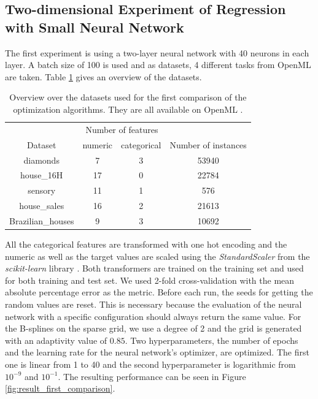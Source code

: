 \subsection{Two-dimensional Experiment of Regression with Small Neural Network}

The first experiment is using a two-layer neural network with 40 neurons in each layer. A batch size of 100 is used and as datasets, 4 different tasks from OpenML are taken. Table \ref{tab:datasets_first_experiment} gives an overview of the datasets. 

\begin{table}[H]
	\centering
	\caption{ Overview over the datasets used for the first comparison of the optimization algorithms. They are all available on OpenML \cite{OpenML2013}. }
	\label{tab:datasets_first_experiment}
	\begin{tabular}{| c | c | c | c |} 
		\hline
		 & \multicolumn{2}{c|}{Number of features} &   \\
		 Dataset& numeric & categorical & Number of instances  \\
		 \hline
		 diamonds & 7 & 3 & 53940  \\
		 house\_16H & 17 & 0 & 22784  \\
		 sensory & 11 & 1 & 576  \\
		 house\_sales & 16 & 2 & 21613  \\
		 Brazilian\_houses & 9 & 3 & 10692  \\
		\hline
	\end{tabular}
\end{table}

All the categorical features are transformed with one hot encoding and the numeric as well as the target values are scaled using the \textit{StandardScaler} from the \textit{scikit-learn} library \cite{scikit-learn}. Both transformers are trained on the training set and used for both training and test set. We used 2-fold cross-validation with the mean absolute percentage error as the metric. Before each run, the seeds for getting the random values are reset. This is necessary because the evaluation of the neural network with a specific configuration should always return the same value. For the B-splines on the sparse grid, we use a degree of 2 and the grid is generated with an adaptivity value of  $ 0.85 $. Two hyperparameters, the number of epochs and the learning rate for the neural network's optimizer, are optimized. The first one is linear from 1 to 40 and the second hyperparameter is logarithmic from $ 10^{-9} $ and $ 10^{-1} $. The resulting performance can be seen in Figure \ref{fig:result_first_comparison}. 

